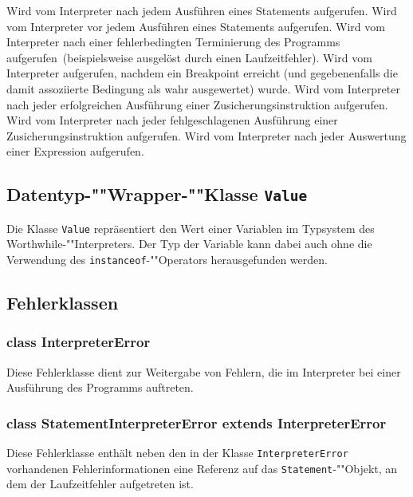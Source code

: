\begin{description}
    Wird vom Interpreter nach jedem Ausführen eines Statements aufgerufen.
    Wird vom Interpreter vor jedem Ausführen eines Statements aufgerufen.
    Wird vom Interpreter nach einer fehlerbedingten Terminierung des Programms aufgerufen~(beispielsweise ausgelöst durch einen Laufzeitfehler).
    Wird vom Interpreter aufgerufen, nachdem ein Breakpoint erreicht (und gegebenenfalls die damit assoziierte Bedingung als wahr ausgewertet) wurde.
    Wird vom Interpreter nach jeder erfolgreichen Ausführung einer Zusicherungsinstruktion aufgerufen.
    Wird vom Interpreter nach jeder fehlgeschlagenen Ausführung einer Zusicherungsinstruktion aufgerufen.
    Wird vom Interpreter nach jeder Auswertung einer Expression aufgerufen.
\end{description}

\subsection{Datentyp-""Wrapper-""Klasse \texttt{Value}}
Die Klasse \texttt{Value} repräsentiert den Wert einer Variablen im Typsystem des Worthwhile-""Interpreters. Der Typ der Variable kann dabei auch ohne die Verwendung des \texttt{instanceof}-""Operators herausgefunden werden.

\subsection{Fehlerklassen}
\subsubsection{class InterpreterError}
Diese Fehlerklasse dient zur Weitergabe von Fehlern, die im Interpreter bei einer Ausführung des Programms auftreten.

\subsubsection{class StatementInterpreterError extends InterpreterError}
Diese Fehlerklasse enthält neben den in der Klasse \texttt{InterpreterError} vorhandenen Fehlerinformationen eine Referenz auf das \texttt{Statement}-""Objekt, an dem der Laufzeitfehler aufgetreten ist.

